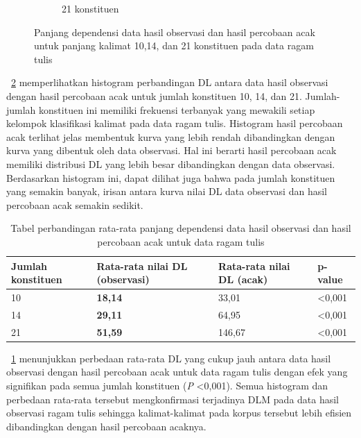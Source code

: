 \begin{figure}
\begin{subfigure}{.45\textwidth}
  \caption{21 konstituen}
  \label{fig:t21randomobs} 
\end{subfigure}

\caption{Panjang dependensi data hasil observasi dan hasil percobaan acak untuk panjang kalimat 10,14, dan 21 konstituen pada data ragam tulis}
\label{fig:trandomobs}
\end{figure}

\pic~\ref{fig:trandomobs} memperlihatkan histogram perbandingan DL antara data hasil observasi dengan hasil percobaan acak untuk jumlah konstituen 10, 14, dan 21. Jumlah-jumlah konstituen ini memiliki frekuensi terbanyak yang mewakili setiap kelompok klasifikasi kalimat pada data ragam tulis.  Histogram hasil percobaan acak terlihat jelas membentuk kurva yang lebih rendah dibandingkan dengan kurva yang dibentuk oleh data observasi. Hal ini berarti hasil percobaan acak memiliki distribusi DL yang lebih besar dibandingkan dengan data observasi. Berdasarkan histogram ini, dapat dilihat juga bahwa pada jumlah konstituen yang semakin banyak, irisan antara kurva nilai DL data observasi dan hasil percobaan acak semakin sedikit.

\begin{table}
\begin{center}
\begin{small}
  \caption{Tabel perbandingan rata-rata panjang dependensi data hasil observasi dan hasil percobaan acak untuk data ragam tulis}  \label{tab:perbandingan_DL_tulis}
  \begin{tabular}{ | l | l | l | l |}
    \hline
    	Jumlah konstituen & Rata-rata nilai DL (observasi) & Rata-rata nilai DL (acak) & p-value \\ \hline
	10 & \textbf{18,14} & 33,01 & \textless 0,001 \\ \hline
	14 & \textbf{29,11} & 64,95 & \textless 0,001 \\ \hline
	21 & \textbf{51,59} & 146,67 & \textless 0,001 \\ \hline
  \end{tabular}
  \end{small}
\end{center}
\end{table}

\tab~\ref{tab:perbandingan_DL_tulis} menunjukkan perbedaan rata-rata DL yang cukup jauh antara data hasil observasi dengan hasil percobaan acak untuk data ragam tulis dengan efek yang signifikan pada semua jumlah konstituen (\textit{P} \textless 0,001). Semua histogram dan perbedaan rata-rata tersebut mengkonfirmasi terjadinya DLM pada data hasil observasi ragam tulis sehingga kalimat-kalimat pada korpus tersebut lebih efisien dibandingkan dengan hasil percobaan acaknya.

